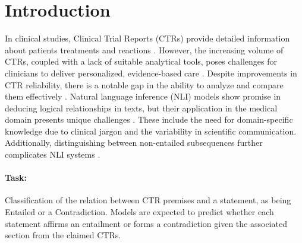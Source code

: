 \section{Introduction}\label{sec:introduction}



In clinical studies, Clinical Trial Reports (CTRs) provide detailed information about patients
treatments and reactions \cite{noauthor_nli4ct_nodate} \cite{jullien_nli4ct_2023}. 
However, the increasing volume of CTRs, coupled with a lack of suitable 
analytical tools, poses challenges for clinicians to deliver personalized, evidence-based care \cite{takehana_stanford_2023}\cite{wang_knowcomp_2023}. 
Despite improvements in CTR reliability, there is a notable gap in the ability to analyze and compare them effectively \cite{vladika_sebis_2023}. 
Natural language inference (NLI) models show promise in deducing logical relationships in texts, but their application 
in the medical domain presents unique challenges \cite{wang_knowcomp_2023}\cite{alissa_just-km_2023}\cite{rajamanickam_i2r_2023}\cite{takehana_stanford_2023}\cite{vladika_sebis_2023}. 
These include the need for domain-specific knowledge due to clinical 
jargon and the variability in scientific communication. Additionally, distinguishing between non-entailed subsequences 
further complicates NLI systems \cite{noauthor_nli4ct_nodate}.


\paragraph{\textbf{Task:}} Classification of the relation between CTR premises and a 
statement, as being Entailed or a Contradiction. Models are expected to predict whether 
each statement affirms an entailment or forms a contradiction given the associated 
section from the claimed CTRs.


